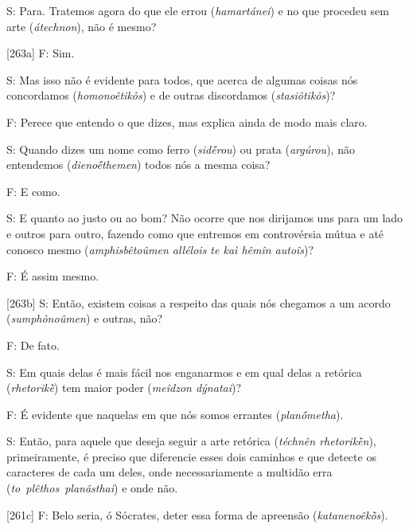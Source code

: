 

S: Para. Tratemos agora do que ele errou (\emph{hamartánei}) e no que
procedeu sem arte (\emph{átechnon}), não é mesmo?

 

[263a] F: Sim.

 

S: Mas isso não é evidente para todos, que acerca de algumas coisas nós
concordamos (\emph{homonoêtikôs}) e de outras discordamos
(\emph{stasiôtikôs})?

 

F: Perece que entendo o que dizes, mas explica ainda de modo mais claro.

 

S: Quando dizes um nome como ferro (\emph{sidḗrou}) ou prata
(\emph{argúrou}), não entendemos (\emph{dienoḗthemen}) todos nós a mesma
coisa?

 

F: E como.

 

S: E quanto ao justo ou ao bom? Não ocorre que nos dirijamos uns para um
lado e outros para outro, fazendo como que entremos em controvérsia
mútua e até conosco mesmo (\emph{amphisbêtoûmen allélois te kaì hêmîn
autoîs})?

 

F: É assim mesmo.

 

[263b] S: Então, existem coisas a respeito das quais nós chegamos a
um acordo (\emph{sumphônoûmen}) e outras, não?

 

F: De fato.

 

S: Em quais delas é mais fácil nos enganarmos e em qual delas a retórica
(\emph{rhetorikḕ}) tem maior poder (\emph{meîdzon dýnatai})?

 

F: É evidente que naquelas em que nós somos errantes
(\emph{planṓmetha}).

 

S: Então, para aquele que deseja seguir a arte retórica (\emph{téchnên
rhetorikḕn}), primeiramente, é preciso que diferencie esses dois
caminhos e que detecte os caracteres de cada um deles, onde
necessariamente a multidão erra
(\emph{to}~\emph{plêthos}~\emph{planâsthai}) e onde não.

 

[261c] F: Belo seria, ó Sócrates, deter essa forma de apreensão
(\emph{katanenoêkṑs}).

